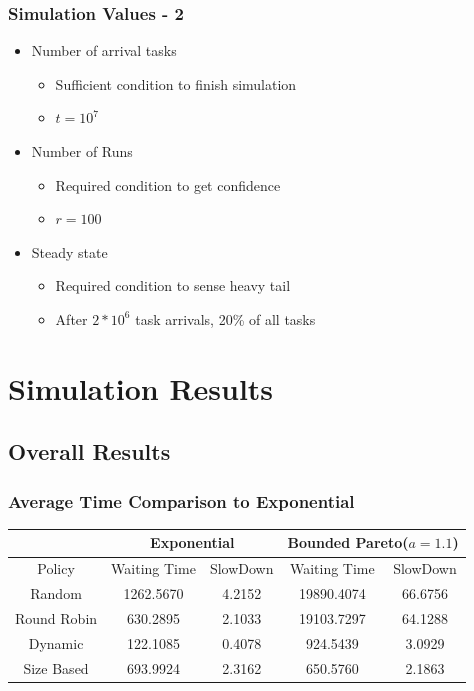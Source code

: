 \documentclass[red]{beamer}
\begin{document}
\begin{frame}
	\frametitle{Simulation Values - 2}
	
	\begin{itemize}
	\item Number of arrival tasks 
		\begin{itemize}
		\item Sufficient condition to finish simulation
		\item $ t = 10^7$
		\end{itemize}
	\item Number of Runs
		\begin{itemize}
		\item Required condition to get confidence
		\item $ r = 100$
		\end{itemize}
	\item Steady state
		\begin{itemize}
		\item Required condition to sense heavy tail
		\item After $2*10^6$ task arrivals, 20\% of all tasks
		\end{itemize}
	\end{itemize}
\end{frame}

\section{Simulation Results}

\subsection{Overall Results}
\begin{frame}
\frametitle{Average Time Comparison to Exponential}

\hspace*{-0.8cm}
\begin{tabular}{|c|c|c|c|c|}
\hline
&\multicolumn{2}{|c|}{Exponential} & \multicolumn{2}{|c|}{Bounded Pareto($a=1.1$)} \\
\hline
Policy & Waiting Time & SlowDown & Waiting Time & SlowDown \\
\hline
Random & 1262.5670 & 4.2152 & 19890.4074 & 66.6756 \\
\hline
Round Robin & 630.2895 & 2.1033 & 19103.7297 & 64.1288 \\
\hline
Dynamic & 122.1085 & 0.4078 & 924.5439 & 3.0929 \\
\hline
Size Based & 693.9924 & 2.3162 & 650.5760	& 2.1863 \\
\hline
\end{tabular}

\end{frame}
\end{document}
